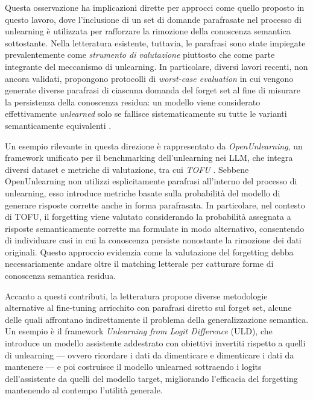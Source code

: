 Questa osservazione ha implicazioni dirette per approcci come quello proposto in questo lavoro, dove l’inclusione di un set di domande parafrasate nel processo di unlearning è utilizzata per rafforzare la rimozione della conoscenza semantica sottostante. Nella letteratura esistente, tuttavia, le parafrasi sono state impiegate prevalentemente come \emph{strumento di valutazione} piuttosto che come parte integrante del meccanismo di unlearning. In particolare, diversi lavori recenti, non ancora validati, propongono protocolli di \emph{worst-case evaluation} in cui vengono generate diverse parafrasi di ciascuna domanda del forget set al fine di misurare la persistenza della conoscenza residua: un modello viene considerato effettivamente \textit{unlearned} solo se fallisce sistematicamente su tutte le varianti semanticamente equivalenti \cite{jia_erasure_2025}.

Un esempio rilevante in questa direzione è rappresentato da \emph{OpenUnlearning}, un framework unificato per il benchmarking dell’unlearning nei LLM, che integra diversi dataset e metriche di valutazione, tra cui \emph{TOFU} \cite{openunlearning2025}. Sebbene OpenUnlearning non utilizzi esplicitamente parafrasi all’interno del processo di unlearning, esso introduce metriche basate sulla probabilità del modello di generare risposte corrette anche in forma parafrasata. In particolare, nel contesto di TOFU, il forgetting viene valutato considerando la probabilità assegnata a risposte semanticamente corrette ma formulate in modo alternativo, consentendo di individuare casi in cui la conoscenza persiste nonostante la rimozione dei dati originali. Questo approccio evidenzia come la valutazione del forgetting debba necessariamente andare oltre il matching letterale per catturare forme di conoscenza semantica residua.

Accanto a questi contributi, la letteratura propone diverse metodologie alternative al fine-tuning arricchito con parafrasi diretto sul forget set, alcune delle quali affrontano indirettamente il problema della generalizzazione semantica. Un esempio è il framework \emph{Unlearning from Logit Difference} (ULD), che introduce un modello assistente addestrato con obiettivi invertiti rispetto a quelli di unlearning — ovvero ricordare i dati da dimenticare e dimenticare i dati da mantenere — e poi costruisce il modello unlearned sottraendo i logits dell’assistente da quelli del modello target, migliorando l’efficacia del forgetting mantenendo al contempo l'utilità generale. \cite{ji_reversing_2024}


